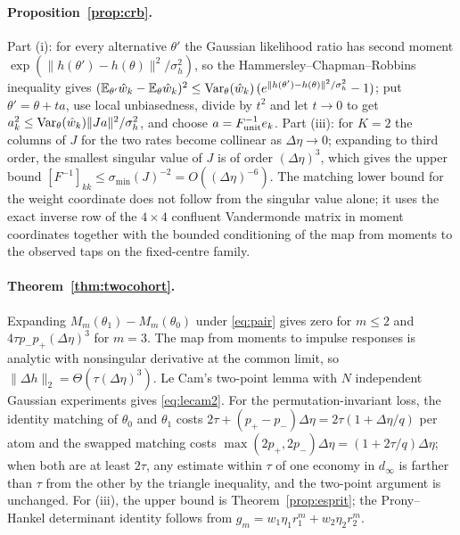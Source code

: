 \documentclass[12pt]{article}
\theoremstyle{definition}
\theoremstyle{remark}
\newcommand{\E}{\mathbb{E}}
\begin{document}
\paragraph{Proposition~\ref{prop:crb}.} Part (i): for every alternative $\theta'$ the Gaussian likelihood ratio has second moment $\exp(\|h(\theta')-h(\theta)\|^2/\sigma_h^2)$, so the Hammersley--Chapman--Robbins inequality gives $(\E_{\theta'}\hat w_k-\E_\theta\hat w_k)^2\le{\rm Var}_\theta(\hat w_k)\,(e^{\|h(\theta')-h(\theta)\|^2/\sigma_h^2}-1)$; put $\theta'=\theta+ta$, use local unbiasedness, divide by $t^2$ and let $t\to0$ to get $a_k^2\le{\rm Var}_\theta(\hat w_k)\|Ja\|^2/\sigma_h^2$, and choose $a=F_{\rm unit}^{-1}e_k$. Part (iii): for $K=2$ the columns of $J$ for the two rates become collinear as $\Delta\eta\to0$; expanding to third order, the smallest singular value of $J$ is of order $(\Delta\eta)^3$, which gives the upper bound $[F^{-1}]_{kk}\le\sigma_{\min}(J)^{-2}=O((\Delta\eta)^{-6})$. The matching lower bound for the weight coordinate does not follow from the singular value alone; it uses the exact inverse row of the $4\times4$ confluent Vandermonde matrix in moment coordinates together with the bounded conditioning of the map from moments to the observed taps on the fixed-centre family.

\paragraph{Theorem~\ref{thm:twocohort}.} Expanding $M_m(\theta_1)-M_m(\theta_0)$ under \eqref{eq:pair} gives zero for $m\le2$ and $4\tau p_-p_+(\Delta\eta)^3$ for $m=3$. The map from moments to impulse responses is analytic with nonsingular derivative at the common limit, so $\|\Delta h\|_2=\Theta(\tau(\Delta\eta)^3)$. Le Cam's two-point lemma with $N$ independent Gaussian experiments gives \eqref{eq:lecam2}. For the permutation-invariant loss, the identity matching of $\theta_0$ and $\theta_1$ costs $2\tau+(p_+-p_-)\Delta\eta=2\tau(1+\Delta\eta/q)$ per atom and the swapped matching costs $\max(2p_+,2p_-)\Delta\eta=(1+2\tau/q)\Delta\eta$; when both are at least $2\tau$, any estimate within $\tau$ of one economy in $d_\infty$ is farther than $\tau$ from the other by the triangle inequality, and the two-point argument is unchanged. For (iii), the upper bound is Theorem~\ref{prop:esprit}; the Prony--Hankel determinant identity follows from $g_m=w_1\eta_1r_1^m+w_2\eta_2r_2^m$.
\end{document}
